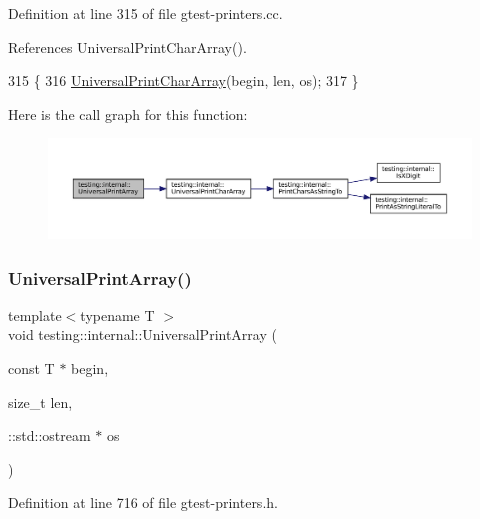 Definition at line 315 of file gtest-\/printers.\+cc.



References Universal\+Print\+Char\+Array().


\begin{DoxyCode}
315                                                                         \{
316   \hyperlink{namespacetesting_1_1internal_ad896a4e4d9133ce43dc18b6038d95dc3}{UniversalPrintCharArray}(begin, len, os);
317 \}
\end{DoxyCode}
Here is the call graph for this function\+:
\nopagebreak
\begin{figure}[H]
\begin{center}
\leavevmode
\includegraphics[width=350pt]{namespacetesting_1_1internal_a52394019018eb5079f9f1bcca23dcd60_cgraph}
\end{center}
\end{figure}
\mbox{\label{namespacetesting_1_1internal_ad79d71c3110f8eb24ab352d68f29436a}} 
\subsubsection{\texorpdfstring{Universal\+Print\+Array()}{UniversalPrintArray()}\hspace{0.1cm}{\footnotesize\ttfamily [3/5]}}
{\footnotesize\ttfamily template$<$typename T $>$ \\
void testing\+::internal\+::\+Universal\+Print\+Array (\begin{DoxyParamCaption}\item[{const T $\ast$}]{begin,  }\item[{size\+\_\+t}]{len,  }\item[{\+::std\+::ostream $\ast$}]{os }\end{DoxyParamCaption})}



Definition at line 716 of file gtest-\/printers.\+h.



